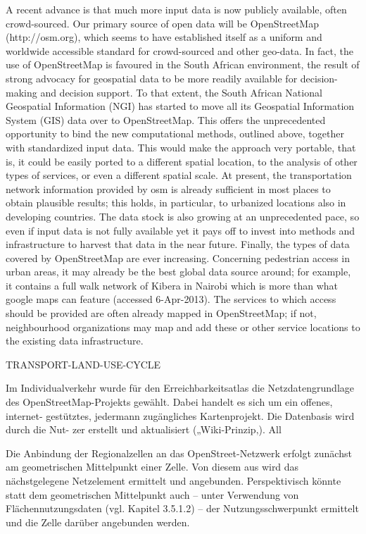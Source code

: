 A recent advance is that much more input data is now publicly available, often crowd-sourced. Our primary source of open data will be OpenStreetMap (http://osm.org), which seems to have established itself as a uniform and worldwide accessible standard for crowd-sourced and other geo-data. In fact, the use of OpenStreetMap is favoured in the South African environment, the result of strong advocacy for geospatial data to be more readily available for decision-making and decision support. To that extent, the South African National Geospatial Information (NGI) has started to move all its Geospatial Information System (GIS) data over to OpenStreetMap.
This offers the unprecedented opportunity to bind the new computational methods, outlined above, together with standardized input data. This would make the approach very portable, that is, it could be easily ported to a different spatial location, to the analysis of other types of services, or even a different spatial scale.
At present, the transportation network information provided by \gls{osm} is already sufficient in most places to obtain plausible results; this holds, in particular, to urbanized locations also in developing countries. The data stock is also growing at an unprecedented pace, so even if input data is not fully available yet it pays off to invest into methods and infrastructure to harvest that data in the near future. Finally, the types of data covered by OpenStreetMap are ever increasing. Concerning pedestrian access in urban areas, it may already be the best global data source around; for example, it contains a full walk network of Kibera in Nairobi which is more than what google maps can feature (accessed 6-Apr-2013). The services to which access should be provided are often already mapped in OpenStreetMap; if not, neighbourhood organizations may map and add these or other service locations to the existing data infrastructure.


TRANSPORT-LAND-USE-CYCLE

Im Individualverkehr wurde für den Erreichbarkeitsatlas die Netzdatengrundlage des OpenStreetMap-Projekts gewählt. Dabei handelt es sich um ein offenes, internet- gestütztes, jedermann zugängliches Kartenprojekt. Die Datenbasis wird durch die Nut- zer erstellt und aktualisiert („Wiki-Prinzip‚). All

Die Anbindung der Regionalzellen an das OpenStreet-Netzwerk erfolgt zunächst am geometrischen Mittelpunkt einer Zelle. Von diesem aus wird das nächstgelegene Netzelement ermittelt und angebunden. Perspektivisch könnte statt dem geometrischen Mittelpunkt auch – unter Verwendung von Flächennutzungsdaten (vgl. Kapitel 3.5.1.2) – der Nutzungsschwerpunkt ermittelt und die Zelle darüber angebunden werden.


